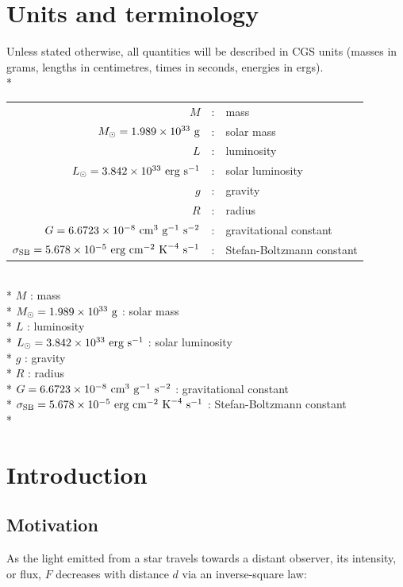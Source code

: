 \documentclass[12pt, a4paper]{report}
\begin{document}
\chapter{Units and terminology}
Unless stated otherwise, all quantities will be described in CGS units (masses in grams, lengths in centimetres, times in seconds, energies in ergs). \\*
\begin{tabular}{r@{ }c@{ }l}
$M$ &:& mass\\
$M_{\odot} = 1.989 \times 10^{33} \textnormal{ g}$ &:& solar mass\\
$L$ &:& luminosity\\
$L_{\odot} = 3.842 \times 10^{33} \textnormal{ erg s}^{-1}$ &:& solar luminosity\\
$g$ &:& gravity\\
$R$ &:& radius\\
$G = 6.6723 \times 10^{-8} \textnormal{ cm}^{3} \textnormal{ g}^{-1} \textnormal{ s}^{-2}$ &:& gravitational constant\\
$\sigma_{\textnormal{SB}} = 5.678 \times 10^{-5} \textnormal{ erg cm}^{-2} \textnormal{ K}^{-4} \textnormal{ s}^{-1}$ & : & Stefan-Boltzmann constant\\
\end{tabular}
\\*
$M$ : mass\\*
$M_{\odot} = 1.989 \times 10^{33} \textnormal{ g}$ : solar mass\\*
$L$ : luminosity\\*
$L_{\odot} = 3.842 \times 10^{33} \textnormal{ erg s}^{-1}$ : solar luminosity\\*
$g$ : gravity\\*
$R$ : radius\\*
$G = 6.6723 \times 10^{-8} \textnormal{ cm}^{3} \textnormal{ g}^{-1} \textnormal{ s}^{-2}$ : gravitational constant\\*
$\sigma_{\textnormal{SB}} = 5.678 \times 10^{-5} \textnormal{ erg cm}^{-2} \textnormal{ K}^{-4} \textnormal{ s}^{-1}$ : Stefan-Boltzmann constant\\*


\chapter{Introduction}
\section{Motivation}
As the light emitted from a star travels towards a distant observer, its intensity, or flux, $F$ decreases with distance $d$ via an inverse-square law:
\end{document}
